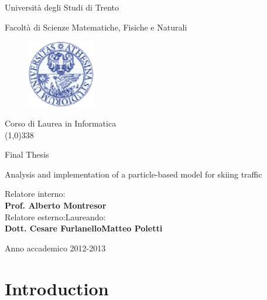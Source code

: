 \documentclass[12pt,a4paper,twoside]{book}
\begin{document}
\begin{titlepage}
  \begin{center}
    \begin{Large}Universit\`a degli Studi di Trento\\\end{Large}
     Facolt\`a di Scienze Matematiche, Fisiche e Naturali\\
     \vspace{10pt}
     \begin{figure}[htbp]
       \begin{center}
         \includegraphics[width=3cm]{images/sigillo_unitn.eps}
       \end{center}
     \end{figure}
Corso di Laurea in Informatica\\

\vspace{10pt}
\line(1,0){338}
\vspace{10pt}

Final Thesis\\
\end{center}
\vspace{3cm}
\begin{center}
\begin{Large}Analysis and implementation of a particle-based model for skiing traffic\\\end{Large}
\vspace{3cm}
\end{center}
Relatore interno: \\ \textbf{Prof. Alberto Montresor} \\
Relatore esterno:\hspace{6.8cm}Laureando:   \\
\textbf{Dott. Cesare Furlanello}\hspace{4.9cm}\textbf{Matteo Poletti}
\vspace{1cm}
\begin{center}
Anno accademico 2012-2013
\end{center}
\end{titlepage}
\tableofcontents
\chapter*{Introduction}
\end{document}
